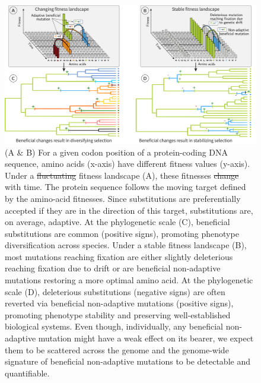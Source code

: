 \documentclass{article}
\providecommand{\DIFaddtex}[1]{{\protect\color{blue}\uwave{#1}}} %
\providecommand{\DIFdeltex}[1]{{\protect\color{red}\sout{#1}}}                      %
\providecommand{\DIFaddFL}[1]{\DIFadd{#1}} %
\providecommand{\DIFdelFL}[1]{\DIFdel{#1}} %
\providecommand{\DIFaddbeginFL}{} %
\providecommand{\DIFaddendFL}{} %
\providecommand{\DIFdelbeginFL}{} %
\providecommand{\DIFdelendFL}{} %
\providecommand{\DIFadd}[1]{\texorpdfstring{\DIFaddtex{#1}}{#1}} %
\providecommand{\DIFdel}[1]{\texorpdfstring{\DIFdeltex{#1}}{}} %
\newcommand{\DIFscaledelfig}{0.5}
\newlength{\DIFdelgraphicswidth} %
\newlength{\DIFdelgraphicsheight} %
\newcommand{\DIFaddincludegraphics}[2][]{{\color{blue}\fbox{\DIFOincludegraphics[#1]{#2}}}} %
\newcommand{\DIFdelincludegraphics}[2][]{%
\sbox{\DIFdelgraphicsbox}{\DIFOincludegraphics[#1]{#2}}%
\settoboxwidth{\DIFdelgraphicswidth}{\DIFdelgraphicsbox} %
\settoboxtotalheight{\DIFdelgraphicsheight}{\DIFdelgraphicsbox} %
\scalebox{\DIFscaledelfig}{%
\parbox[b]{\DIFdelgraphicswidth}{\usebox{\DIFdelgraphicsbox}\\[-\baselineskip] \rule{\DIFdelgraphicswidth}{0em}}\llap{\resizebox{\DIFdelgraphicswidth}{\DIFdelgraphicsheight}{%
\setlength{\unitlength}{\DIFdelgraphicswidth}%
\begin{picture}(1,1)%
\thicklines\linethickness{2pt} %
{\color[rgb]{1,0,0}\put(0,0){\framebox(1,1){}}}%
{\color[rgb]{1,0,0}\put(0,0){\line( 1,1){1}}}%
{\color[rgb]{1,0,0}\put(0,1){\line(1,-1){1}}}%
\end{picture}%
}\hspace*{3pt}}} %
} %
\DeclareRobustCommand{\DIFaddbeginFL}{\DIFOaddbeginFL \let\includegraphics\DIFaddincludegraphics} %
\DeclareRobustCommand{\DIFaddendFL}{\DIFOaddendFL \let\includegraphics\DIFOincludegraphics} %
\DeclareRobustCommand{\DIFdelbeginFL}{\DIFOdelbeginFL \let\includegraphics\DIFdelincludegraphics} %
\DeclareRobustCommand{\DIFdelendFL}{\DIFOaddendFL \let\includegraphics\DIFOincludegraphics} %
\begin{document}
    \begin{figure}[!htb]
        \centering
        \includegraphics[width=\textwidth, page=1] {artworks/figure.fitness-landscape}
        \caption{
            (A \& B) For a given codon position of a protein-coding DNA sequence, amino acids (x-axis) have different fitness values (y-axis).
            Under a \DIFdelbeginFL \DIFdelFL{fluctuating }\DIFdelendFL \DIFaddbeginFL \DIFaddFL{changing }\DIFaddendFL fitness landscape (A), these fitnesses \DIFdelbeginFL \DIFdelFL{change }\DIFdelendFL \DIFaddbeginFL \DIFaddFL{fluctuate }\DIFaddendFL with time.
            The protein sequence follows the moving target defined by the amino-acid fitnesses. Since substitutions are preferentially accepted if they are in the direction of this target, substitutions are, on average, adaptive.
            At the phylogenetic scale (C), beneficial substitutions are common (positive signs), promoting phenotype diversification across species.
            Under a stable fitness landscape (B), most mutations reaching fixation are either slightly deleterious reaching fixation due to drift or are beneficial non-adaptive mutations restoring a more optimal amino acid.
            At the phylogenetic scale (D), deleterious substitutions (negative signs) are often reverted via beneficial non-adaptive mutations (positive signs), promoting phenotype stability and preserving well-established biological systems.
            Even though, individually, any beneficial non-adaptive mutation might have a weak effect on its bearer, we expect them to be scattered across the genome and the genome-wide signature of beneficial non-adaptive mutations to be detectable and quantifiable.}
        \label{fig:fitness-landscape}
    \end{figure}
\end{document}
